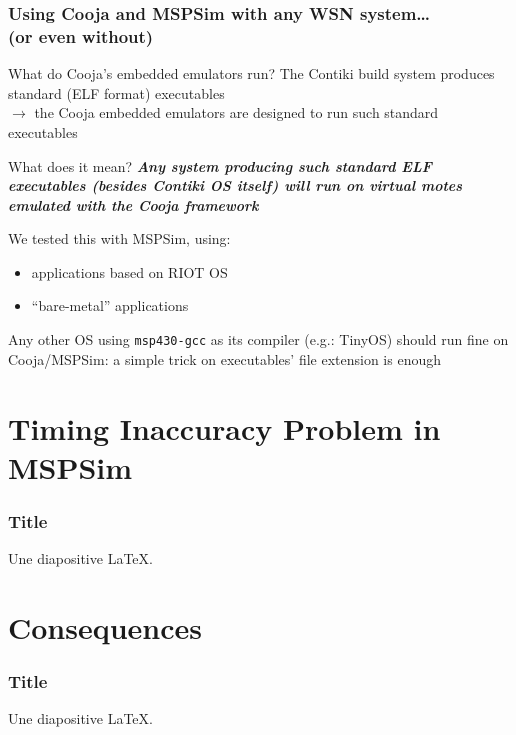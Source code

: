 \documentclass[10pt,c]{beamer}
\renewcommand{\emph}[1]{\textbf{\textit{#1}}}
\begin{document}
\begin{frame}
\frametitle{Using Cooja and MSPSim with any WSN system\ldots \\
            (or even without)}
\begin{block}{What do Cooja's embedded emulators run?}
\small
The Contiki build system produces standard (ELF format) executables \\
$\rightarrow$ the Cooja embedded emulators are designed to run such
standard executables
\end{block}
\begin{exampleblock}{What does it mean?}
\small
\emph{Any system producing such standard ELF executables (besides Contiki
OS itself) will run on virtual motes emulated with the Cooja framework}

We tested this with MSPSim, using:
\begin{itemize}
\item applications based on RIOT OS
\item ``bare-metal'' applications
\end{itemize}

Any other OS using \texttt{msp430-gcc} as its compiler (e.g.: TinyOS)
should run fine on Cooja/MSPSim: a simple trick on executables' file
extension is enough
\end{exampleblock}
\end{frame}


\section{Timing Inaccuracy Problem in MSPSim}

\begin{frame}
\frametitle{Title}
Une diapositive \LaTeX.
\end{frame}


\section{Consequences}

\begin{frame}
\frametitle{Title}
Une diapositive \LaTeX.
\end{frame}

\end{document}
